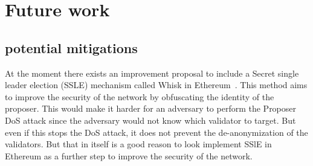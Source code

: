 

\section{Future work}\label{sec:future-works}

\subsection{potential mitigations}\label{subsec:potential-mitigations}
At the moment there exists an improvement proposal to include a Secret single leader election (SSLE) mechanism called Whisk in Ethereum~\cite{EthereumResearchSSLE2024}.
This method aims to improve the security of the network by obfuscating the identity of the proposer.
This would make it harder for an adversary to perform the Proposer DoS attack since the adversary would not know which validator to target.
But even if this stops the DoS attack, it does not prevent the de-anonymization of the validators.
But that in itself is a good reason to look implement SSlE in Ethereum as a further step to improve the security of the network.
